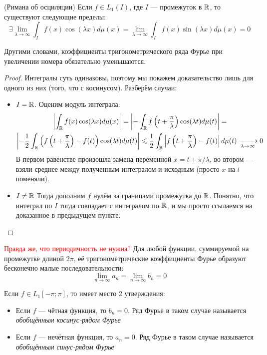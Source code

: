 \begin{theorem} (Римана об осциляции)
	Если $f \in L_1(I)$, где $I$ --- промежуток в $\mathbb{R}$, то существуют следующие пределы:
	\[
		\exists \lim_{\lambda \to \infty} \int_I f(x)\cos(\lambda x)d\mu(x) = \lim_{\lambda \to \infty} \int_I f(x)\sin(\lambda x)d\mu(x) = 0
	\]
\end{theorem}

\begin{note}
	Другими словами, коэффициенты тригонометрического ряда Фурье при увеличении номера обязательно уменьшаются.
\end{note}

\begin{proof}
	Интегралы суть одинаковы, поэтому мы покажем доказательство лишь для одного из них (того, что с косинусом). Разберём случаи:
	\begin{itemize}
		\item $I = \mathbb{R}$. Оценим модуль интеграла:
		\begin{multline*}
			\left|\int_{\mathbb{R}} f(x)\cos(\lambda x)d\mu(x)\right| = \left|-\int_{\mathbb{R}} f\left(t + \frac{\pi}{\lambda}\right)\cos(\lambda t)d\mu(t)\right| =
			\\
			\left|-\frac{1}{2}\int_{\mathbb{R}} \left(f\left(t + \frac{\pi}{\lambda}\right) - f(t)\right)\cos(\lambda t)d\mu(t)\right| \leqslant \frac{1}{2}\int_{\mathbb{R}} \left|f\left(t + \frac{\pi}{\lambda}\right) - f(t)\right|d\mu(t) \xrightarrow[\lambda \to \infty]{} 0
		\end{multline*}
		В первом равенстве произошла замена переменной $x = t + \pi / \lambda$, во втором --- взяли среднее между полученным интегралом и исходным (просто $x$ на $t$ поменяли).
		
		\item $I \neq \mathbb{R}$ Тогда дополним $f$ нулём за границами промежутка до $\mathbb{R}$. Понятно, что интеграл по $I$ тогда совпадает с интегралом по $\mathbb{R}$, и мы просто ссылаемся на доказанное в предыдущем пункте.
	\end{itemize}
\end{proof}

\begin{corollary} \textcolor{red}{Правда же, что периодичность не нужна?}
	Для любой функции, суммируемой на промежутке длиной $2\pi$, её тригонометрические коэффициенты Фурье образуют бесконечно малые последовательности:
	\[
		\lim_{n \to \infty} a_n = \lim_{n \to \infty} b_n = 0
	\]
\end{corollary}

\begin{proposition}
	Если $f \in L_1[-\pi; \pi]$, то имеет место 2 утверждения:
	\begin{itemize}
		\item Если $f$ --- чётная функция, то $b_n = 0$. Ряд Фурье в таком случае называется \textit{обобщённым косинус-рядом Фурье}
		
		\item Если $f$ --- нечётная функция, то $a_n = 0$. Ряд Фурье в таком случае называется \textit{обобщённым синус-рядом Фурье}
	\end{itemize}
\end{proposition}

